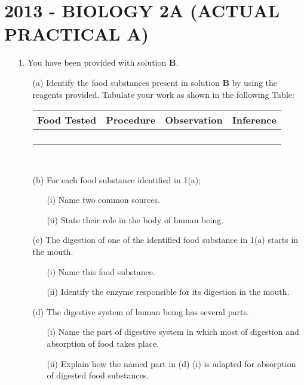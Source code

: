 \section{2013 - BIOLOGY 2A (ACTUAL PRACTICAL A)}

\begin{enumerate}
\item[1.] You have been provided with solution \textbf{B}.
\begin{enumerate}
\item[(a)] Identify the food substances present in solution \textbf{B} by using the reagents provided. Tabulate your work as shown in the following Table:

\begin{center}
\begin{tabular}{|p{3cm}|p{3cm}|p{3cm}|p{3cm}|} \hline
\multicolumn{1}{|c|}{\textbf{Food Tested}}&\multicolumn{1}{c|}{\textbf{Procedure}}&\multicolumn{1}{c|}{\textbf{Observation}}&\multicolumn{1}{c|}{\textbf{Inference}} \\ \hline
&&& \\
&&& \\
&&& \\
&&& \\ \hline
\end{tabular} \\[10pt]
\end{center}

\item[(b)] For each food substance identified in 1(a);
\begin{enumerate}
\item[(i)] Name two common sources.
\item[(ii)] State their role in the body of human being.
\end{enumerate}
\item[(c)] The digestion of one of the identified food substance in 1(a) starts in the mouth.
\begin{enumerate}
\item[(i)] Name this food substance.
\item[(ii)] Identify the enzyme responsible for its digestion in the mouth.
\end{enumerate}
\item[(d)] The digestive system of human being has several parts.
\begin{enumerate}
\item[(i)] Name the part of digestive system in which most of digestion and absorption of food takes place.
\item[(ii)] Explain how the named part in (d) (i) is adapted for absorption of digested food substances.
\end{enumerate}
\end{enumerate}


\end{enumerate}
